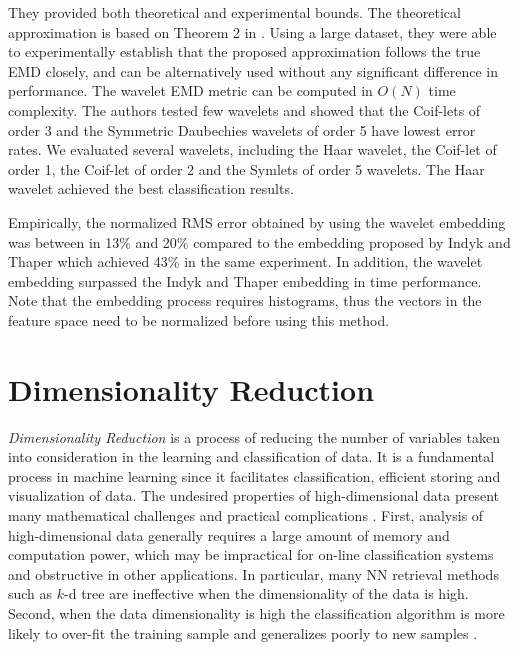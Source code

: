 \iftoggle{edit-mode}{\hspace{0pt}\marginpar{shirdhonkar - theoretical and empirical bounds}}{}
They provided both theoretical and experimental bounds. 
The theoretical approximation is based on Theorem 2 in \cite{shirdhonkar2008approximate}. 
Using a large dataset, they were able to experimentally establish that the proposed approximation follows the true EMD closely, and can be alternatively used without any significant difference in performance. 
The wavelet EMD metric can be computed in $O\left( N \right)$ time complexity. 
The authors tested few wavelets and showed that the Coif-lets of order 3 and the Symmetric Daubechies wavelets of order 5 have lowest error rates. 
We evaluated several wavelets, including the Haar wavelet, the Coif-let of order 1, the Coif-let of order 2 and the Symlets of order 5 wavelets.
The Haar wavelet achieved the best classification results.

\iftoggle{edit-mode}{\hspace{0pt}\marginpar{Performance - Indyk vs. shirdhonkar}}{}
Empirically, the normalized RMS error obtained by using the wavelet embedding was between in 13\% and 20\% compared to the embedding proposed by Indyk and Thaper which achieved 43\% in the same experiment. 
In addition, the wavelet embedding surpassed the Indyk and Thaper embedding in time performance.
Note that the embedding process requires histograms, thus the vectors in the feature space need to be normalized before using this method.

 
\newpage{}

\section{Dimensionality Reduction}
\label{sec:dr}

\iftoggle{edit-mode}{\hspace{0pt}\marginpar{What is DR and what techniques are there?}}{}
\emph{Dimensionality Reduction} is a process of reducing the number of variables taken into consideration in the learning and classification of data. 
It is a fundamental process in machine learning since it facilitates classification, efficient storing and visualization of data. 
The undesired properties of high-dimensional data present many mathematical challenges and practical complications \cite{van2009dimensionality}. 
First, analysis of high-dimensional data generally requires a large amount of memory and computation power, which may be impractical for on-line classification systems and obstructive in other applications. 
In particular, many NN retrieval methods such as $k$-d tree are ineffective when the dimensionality of the data is high.
Second, when the data dimensionality is high the classification algorithm is more likely to over-fit the training sample and generalizes poorly to new samples \cite{aida2009word}.

